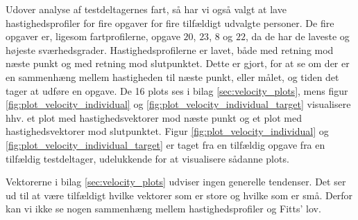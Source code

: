 Udover analyse af testdeltagernes fart, så har vi også valgt at lave hastighedsprofiler for fire opgaver for fire tilfældigt udvalgte personer. De fire opgaver er, ligesom fartprofilerne, opgave $20$, $23$, $8$ og $22$, da de har de laveste og højeste sværhedsgrader. Hastighedsprofilerne er lavet, både med retning mod næste punkt og med retning mod slutpunktet. Dette er gjort, for at se om der er en sammenhæng mellem hastigheden til næste punkt, eller målet, og tiden det tager at udføre en opgave. De 16 plots ses i bilag \ref{sec:velocity_plots}, mens figur \ref{fig:plot_velocity_individual} og \ref{fig:plot_velocity_individual_target} visualisere hhv. et plot med hastighedsvektorer mod næste punkt og et plot med hastighedsvektorer mod slutpunktet. Figur \ref{fig:plot_velocity_individual} og \ref{fig:plot_velocity_individual_target} er taget fra en tilfældig opgave fra en tilfældig testdeltager, udelukkende for at visualisere sådanne plots. 

Vektorerne i bilag \ref{sec:velocity_plots} udviser ingen generelle tendenser. Det ser ud til at være tilfældigt hvilke vektorer som er store og hvilke som er små. Derfor kan vi ikke se nogen sammenhæng mellem hastighedsprofiler og Fitts' lov. 


